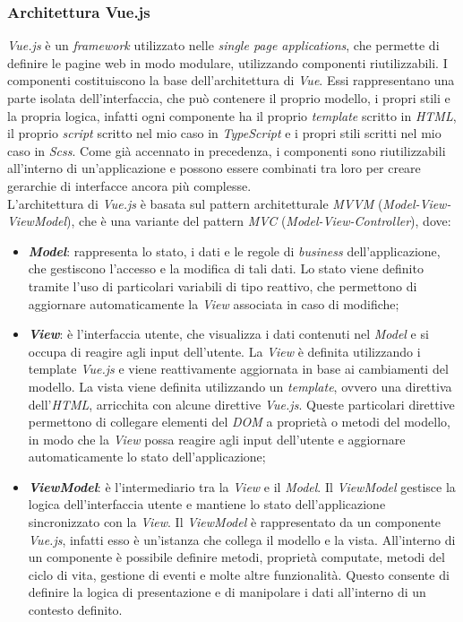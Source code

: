 \subsubsection{Architettura Vue.js}\label{subsubsec:architettura-vue.js}
\textit{Vue.js} è un \textit{framework} utilizzato nelle \textit{single page applications}, che permette di definire le pagine web in modo modulare, utilizzando componenti riutilizzabili.
I componenti costituiscono la base dell'architettura di \textit{Vue}. Essi rappresentano una parte isolata dell'interfaccia, che può contenere il proprio modello, i propri stili e la propria logica, infatti ogni componente ha il proprio
\textit{template} scritto in \textit{HTML}, il proprio \textit{script} scritto nel mio caso in \textit{TypeScript} e i propri stili scritti nel mio caso in \textit{Scss}.
Come già accennato in precedenza, i componenti sono riutilizzabili all'interno di un'applicazione e possono essere combinati tra loro per creare gerarchie di interfacce ancora più complesse.\\

L'architettura di \textit{Vue.js} è basata sul pattern architetturale \textit{MVVM} (\textit{Model-View-ViewModel}), che è una variante del pattern \textit{MVC} (\textit{Model-View-Controller}), dove:
\begin{itemize}
  \item \textbf{\textit{Model}}: rappresenta lo stato, i dati e le regole di \textit{business} dell'applicazione, che gestiscono l'accesso e la modifica di tali dati. Lo stato viene definito tramite l'uso
  di particolari variabili di tipo reattivo, che permettono di aggiornare automaticamente la \textit{View} associata in caso di modifiche;
  \item \textbf{\textit{View}}: è l'interfaccia utente, che visualizza i dati contenuti nel \textit{Model} e si occupa di reagire agli input dell'utente. La \textit{View} è definita utilizzando i template \textit{Vue.js} e viene reattivamente aggiornata in base ai cambiamenti del modello. La vista viene definita utilizzando un \textit{template}, ovvero una direttiva dell'\textit{HTML}, arricchita con alcune direttive \textit{Vue.js}. 
  Queste particolari direttive permettono di collegare elementi del \textit{DOM} a proprietà o metodi del modello, in modo che la \textit{View} possa reagire agli input dell'utente e aggiornare automaticamente lo stato dell'applicazione;
  \item \textbf{\textit{ViewModel}}: è l'intermediario tra la \textit{View} e il \textit{Model}. Il \textit{ViewModel} gestisce la logica dell'interfaccia utente e mantiene lo stato dell'applicazione sincronizzato con la \textit{View}.
  Il \textit{ViewModel} è rappresentato da un componente \textit{Vue.js}, infatti esso è un'istanza che collega il modello e la vista. All'interno di un componente è possibile definire metodi, proprietà 
  computate, metodi del ciclo di vita, gestione di eventi e molte altre funzionalità. Questo consente di definire la logica di presentazione e di manipolare i dati all'interno di un contesto definito.
\end{itemize}

